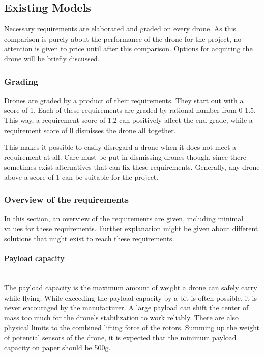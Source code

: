 \subsection{Existing Models}
Necessary requirements are elaborated and graded on every drone. As this comparison is purely about the performance of the drone for the project, no attention is given to price until after this comparison. Options for acquiring the drone will be briefly discussed.

\subsubsection{Grading} \label{grading}
Drones are graded by a product of their requirements. They start out with a score of 1. Each of these requirements are graded by rational number from 0-1.5. This way, a requirement score of 1.2 can positively affect the end grade, while a requirement score of 0 dismisses the drone all together. 

This makes it possible to easily disregard a drone when it does not meet a requirement at all. Care must be put in dismissing drones though, since there sometimes exist alternatives that can fix these requirements. Generally, any drone above a score of 1 can be suitable for the project. 

\subsubsection{Overview of the requirements}
In this section, an overview of the requirements are given, including minimal values for these requirements. Further explanation might be given about different solutions that might exist to reach these requirements. 

\paragraph{Payload capacity}\mbox{} \\
The payload capacity is the maximum amount of weight a drone can safely carry while flying. While exceeding the payload capacity by a bit is often possible, it is never encouraged by the manufacturer. A large payload can shift the center of mass too much for the drone's stabilization to work reliably. There are also physical limits to the combined lifting force of the rotors. Summing up the weight of potential sensors of the drone, it is expected that the minimum payload capacity on paper should be 500g.

